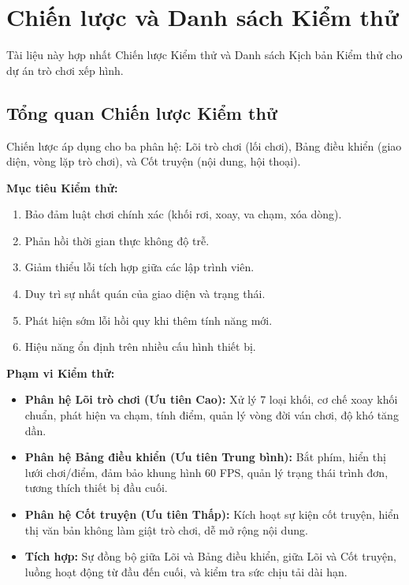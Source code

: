 \documentclass[12pt,a4paper]{article}
\begin{document}
\providecommand{\StandaloneSectionSetup}[2]{\ApplyStandardFooter{#1}{#2}}
\StandaloneSectionSetup{05-gameTest}{LastPageTesting}
\onehalfspacing

\section{Chiến lược và Danh sách Kiểm thử}

Tài liệu này hợp nhất Chiến lược Kiểm thử và Danh sách Kịch bản Kiểm thử cho dự án trò chơi xếp hình.

\subsection{Tổng quan Chiến lược Kiểm thử}

Chiến lược áp dụng cho ba phân hệ: Lõi trò chơi (lối chơi), Bảng điều khiển (giao diện, vòng lặp trò chơi), và Cốt truyện (nội dung, hội thoại).

\textbf{Mục tiêu Kiểm thử:}
\begin{enumerate}[nosep]
  \item Bảo đảm luật chơi chính xác (khối rơi, xoay, va chạm, xóa dòng).
  \item Phản hồi thời gian thực không độ trễ.
  \item Giảm thiểu lỗi tích hợp giữa các lập trình viên.
  \item Duy trì sự nhất quán của giao diện và trạng thái.
  \item Phát hiện sớm lỗi hồi quy khi thêm tính năng mới.
  \item Hiệu năng ổn định trên nhiều cấu hình thiết bị.
\end{enumerate}

\textbf{Phạm vi Kiểm thử:}
\begin{itemize}[nosep]
  \item \textbf{Phân hệ Lõi trò chơi (Ưu tiên Cao):} Xử lý 7 loại khối, cơ chế xoay khối chuẩn, phát hiện va chạm, tính điểm, quản lý vòng đời ván chơi, độ khó tăng dần.
  \item \textbf{Phân hệ Bảng điều khiển (Ưu tiên Trung bình):} Bắt phím, hiển thị lưới chơi/điểm, đảm bảo khung hình 60 FPS, quản lý trạng thái trình đơn, tương thích thiết bị đầu cuối.
  \item \textbf{Phân hệ Cốt truyện (Ưu tiên Thấp):} Kích hoạt sự kiện cốt truyện, hiển thị văn bản không làm giật trò chơi, dễ mở rộng nội dung.
  \item \textbf{Tích hợp:} Sự đồng bộ giữa Lõi và Bảng điều khiển, giữa Lõi và Cốt truyện, luồng hoạt động từ đầu đến cuối, và kiểm tra sức chịu tải dài hạn.
\end{itemize}
\end{document}
